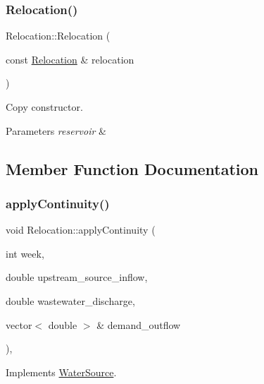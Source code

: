 \mbox{\label{classRelocation_a51eeb6a7d2b07940c2688b9b550145f0}} 
\subsubsection{\texorpdfstring{Relocation()}{Relocation()}\hspace{0.1cm}{\footnotesize\ttfamily [2/2]}}
{\footnotesize\ttfamily Relocation\+::\+Relocation (\begin{DoxyParamCaption}\item[{const \mbox{\hyperlink{classRelocation}{Relocation}} \&}]{relocation }\end{DoxyParamCaption})}

Copy constructor. 
\begin{DoxyParams}{Parameters}
{\em reservoir} & \\
\hline
\end{DoxyParams}


\subsection{Member Function Documentation}
\mbox{\label{classRelocation_af5c795c7b331b86b31c8bfa2ef9b6fe5}} 
\subsubsection{\texorpdfstring{apply\+Continuity()}{applyContinuity()}}
{\footnotesize\ttfamily void Relocation\+::apply\+Continuity (\begin{DoxyParamCaption}\item[{int}]{week,  }\item[{double}]{upstream\+\_\+source\+\_\+inflow,  }\item[{double}]{wastewater\+\_\+discharge,  }\item[{vector$<$ double $>$ \&}]{demand\+\_\+outflow }\end{DoxyParamCaption})\hspace{0.3cm}{\ttfamily [override]}, {\ttfamily [virtual]}}



Implements \mbox{\hyperlink{classWaterSource_ac070445379fe706f65b977dade4f3fbc}{Water\+Source}}.

